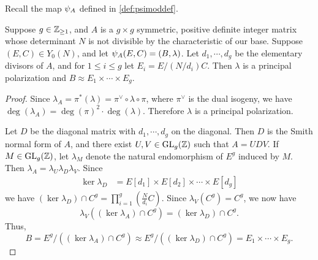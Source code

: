 \documentclass{amsart}
\begin{document}
Recall the map $\psi_{A}$ defined in \eqref{def:psimoddef}.

\begin{lemma}\label{lem:psimod-weakly-isomorphic-to-product}
Suppose $g\in\mathbb{Z}_{\ge 1}$, and $A$ is a $g \times g$ symmetric, positive definite integer matrix whose determinant $N$ is not divisible by the characteristic of our base. %
Suppose $(E,C) \in Y_0(N)$, and let $\psi_{A}(E,C) = (B,\lambda)$. Let $d_1, \cdots, d_g$ be the elementary divisors of $A$, and for $1 \le i \le g$ let $E_i = E/(N/d_i)C$. Then $\lambda$ is a principal polarization and 
$
    B \approx E_1 \times \cdots \times E_g.
$
\end{lemma}

\begin{proof}
Since $\lambda_A = \pi^*(\lambda) = \pi^\vee \circ \lambda \circ \pi$, where $\pi^\vee$ is the dual isogeny, we have $\deg(\lambda_A) = \deg(\pi)^2 \cdot \deg(\lambda)$. Therefore $\lambda$ is a principal polarization.
  
Let $D$ be the diagonal matrix with $d_1, \cdots, d_g$ on the diagonal.
Then $D$ is the Smith normal form of $A$, and there exist $U,V \in \operatorname{GL}_g(\mathbb{Z})$ such that $A = UDV$.
If $M \in \operatorname{GL}_g(\mathbb{Z})$, let $\lambda_M$ denote the natural endomorphism of $E^g$ induced by $M$.
Then %
$\lambda_A = \lambda_U \lambda_D \lambda_V$. Since
  \begin{align*}
    \ker \lambda_D &= E[d_1] \times E[d_2] \times \cdots \times E[d_g]
  \end{align*}
  we have $(\ker \lambda_D) \cap C^g = \prod_{i=1}^g (\frac{N}{d_i}C)$.
 Since $\lambda_V(C^g) = C^g$, we now have
  \[
    \lambda_V((\ker \lambda_A) \cap C^g) = (\ker \lambda_D) \cap C^g.
  \]
  Thus,
  $$
  B = E^g/((\ker \lambda_A) \cap C^g) \approx E^g/((\ker \lambda_D) \cap C^g) = E_1 \times \cdots \times E_g.
  $$
\end{proof}
\end{document}
